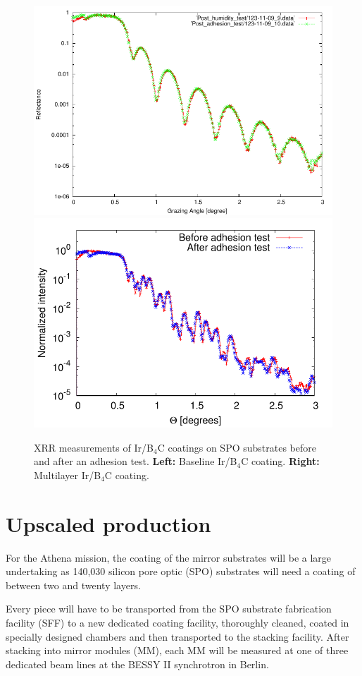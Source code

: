 \begin{figure}[!h]
  \center  \includegraphics[width=0.47\linewidth]{figures/athena/coating_on_spo/123-11-09_Adhesion_test.pdf}
  \includegraphics[width=0.47\linewidth]{figures/athena/coating_on_spo/120-09-26_adh_2.pdf}
\caption{\footnotesize XRR measurements of Ir/B$_4$C coatings on SPO substrates before and after an adhesion test. \textbf{Left:} Baseline Ir/B$_4$C coating. \textbf{Right:} Multilayer Ir/B$_4$C coating.}\label{fig:qa_adh}
\end{figure}


\section{Upscaled production}\label{sec:Athena_upscaled}


For the Athena mission, the coating of the mirror substrates will be a large undertaking as 140,030 silicon pore optic (SPO) substrates will need a coating of between two and twenty layers.

Every piece will have to be transported from the SPO substrate fabrication facility (SFF) to a new dedicated coating facility, thoroughly cleaned, coated in specially designed chambers and then transported to the stacking facility. After stacking into mirror modules (MM), each MM will be measured at one of three dedicated beam lines at the BESSY II synchrotron in Berlin.

